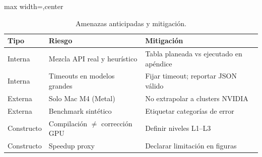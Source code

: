 \begin{table}[ht]
\centering
\caption{Amenazas anticipadas y mitigación.}
\label{tab:amenazas_pre}
\footnotesize
\begin{adjustbox}{max width=\linewidth,center}
\begin{tabularx}{\linewidth}{@{}lXX@{}}
\toprule
Tipo & Riesgo & Mitigación \\
\midrule
Interna & Mezcla API real y heurístico & Tabla planeada vs ejecutado en apéndice \\
Interna & Timeouts en modelos grandes & Fijar timeout; reportar JSON válido \\
Externa & Solo Mac M4 (Metal) & No extrapolar a clusters NVIDIA \\
Externa & Benchmark sintético & Etiquetar categorías de error \\
Constructo & Compilación $\neq$ corrección GPU & Definir niveles L1--L3 \\
Constructo & Speedup proxy & Declarar limitación en figuras \\
\bottomrule
\end{tabularx}
\end{adjustbox}
\end{table}
